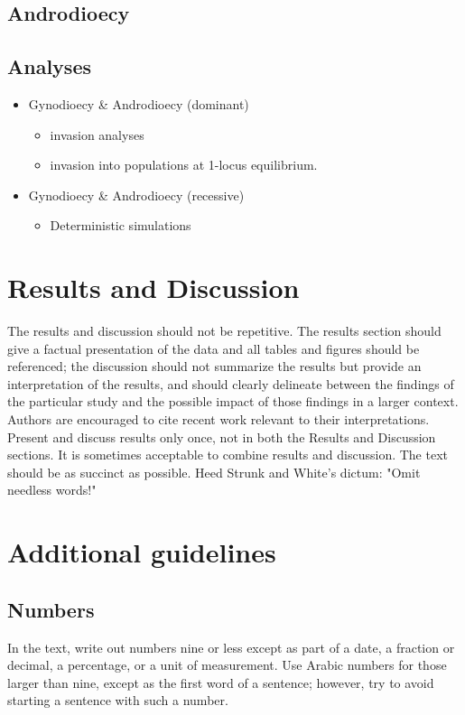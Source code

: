 \documentclass[9pt,twocolumn,twoside,lineno]{gsajnl}
\begin{document}
\subsection{Androdioecy}

\subsection{Analyses}
\begin{itemize}
	\item Gynodioecy \& Androdioecy (dominant)
	\begin{itemize}
		\item invasion analyses
		\item invasion into populations at 1-locus equilibrium.
	\end{itemize}
	\item Gynodioecy \& Androdioecy (recessive)
	\begin{itemize}
		\item Deterministic simulations
	\end{itemize}
	
\end{itemize}



\section{Results and Discussion}

The results and discussion should not be repetitive. The results section should give a factual presentation of the data and all tables and figures should be referenced; the discussion should not summarize the results but provide an interpretation of the results, and should clearly delineate between the findings of the particular study and the possible impact of those findings in a larger context. Authors are encouraged to cite recent work relevant to their interpretations. Present and discuss results only once, not in both the Results and Discussion sections. It is sometimes acceptable to combine results and discussion. The text should be as succinct as possible. Heed Strunk and White's dictum: "Omit needless words!"

\section{Additional guidelines}

\subsection{Numbers} In the text, write out numbers nine or less except as part of a date, a fraction or decimal, a percentage, or a unit of measurement. Use Arabic numbers for those larger than nine, except as the first word of a sentence; however, try to avoid starting a sentence with such a number.
\end{document}
